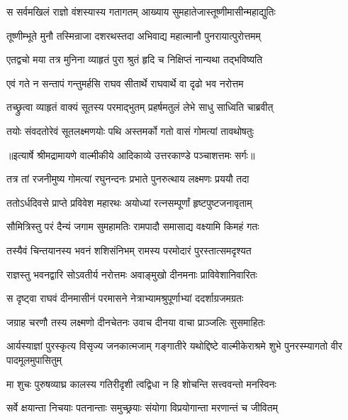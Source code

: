 \twolineshloka
{स सर्वमखिलं राज्ञो वंशस्यास्य गतागतम्}
{आख्याय सुमहातेजास्तूष्णीमासीन्महाद्युतिः} %

\twolineshloka
{तूष्णीम्भूते मुनौ तस्मिन्राजा दशरथस्तदा}
{अभिवाद्य महात्मानौ पुनरायात्पुरोत्तमम्} %

\twolineshloka
{एतद्वचो मया तत्र मुनिना व्याहृतं पुरा}
{श्रुतं हृदि च निक्षिप्तं नान्यथा तद्भविष्यति} %

\twolineshloka
{एवं गते न सन्तापं गन्तुमर्हसि राघव}
{सीतार्थे राघवार्थे वा दृढो भव नरोत्तम} %

\twolineshloka
{तच्छ्रुत्वा व्याहृतं वाक्यं सूतस्य परमाद्भुतम्}
{प्रहर्षमतुलं लेभे साधु साध्विति चाब्रवीत्} %

\twolineshloka
{तयोः संवदतोरेवं सूतलक्ष्मणयोः पथि}
{अस्तमर्को गतो वासं गोमत्यां तावथोषतुः} %


{॥इत्यार्षे श्रीमद्रामायणे वाल्मीकीये आदिकाव्ये उत्तरकाण्डे पञ्चाशत्तमः सर्गः॥}


\twolineshloka
{तत्र तां रजनीमुष्य गोमत्यां रघुनन्दनः}
{प्रभाते पुनरुत्थाय लक्ष्मणः प्रययौ तदा} %

\twolineshloka
{ततोऽर्धदिवसे प्राप्ते प्रविवेश महारथः}
{अयोध्यां रत्नसम्पूर्णां हृष्टपुष्टजनावृताम्} %

\twolineshloka
{सौमित्रिस्तु परं दैन्यं जगाम सुमहामतिः}
{रामपादौ समासाद्य वक्ष्यामि किमहं गतः} %

\twolineshloka
{तस्यैवं चिन्तयानस्य भवनं शशिसंनिभम्}
{रामस्य परमोदारं पुरस्तात्समदृश्यत} %

\twolineshloka
{राज्ञस्तु भवनद्वारि सोऽवतीर्य नरोत्तमः}
{अवाङ्मुखो दीनमनाः प्राविवेशानिवारितः} %

\twolineshloka
{स दृष्ट्वा राघवं दीनमासीनं परमासने}
{नेत्राभ्यामश्रुपूर्णाभ्यां ददर्शाग्रजमग्रतः} %

\twolineshloka
{जग्राह चरणौ तस्य लक्ष्मणो दीनचेतनः}
{उवाच दीनया वाचा प्राञ्जलिः सुसमाहितः} %

\threelineshloka
{आर्यस्याज्ञां पुरस्कृत्य विसृज्य जनकात्मजाम्}
{गङ्गातीरे यथोद्दिष्टे वाल्मीकेराश्रमे शुभे}
{पुनरस्म्यागतो वीर पादमूलमुपासितुम्} %

\twolineshloka
{मा शुचः पुरुषव्याघ्र कालस्य गतिरीदृशी}
{त्वद्विधा न हि शोचन्ति सत्त्ववन्तो मनस्विनः} %

\twolineshloka
{सर्वे क्षयान्ता निचयाः पतनान्ताः समुच्छ्रयाः}
{संयोगा विप्रयोगान्ता मरणान्तं च जीवितम्} %

